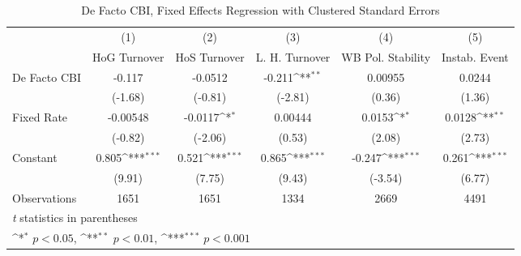 \begin{table}[htbp]\centering
\def\sym#1{\ifmmode^{#1}\else\(^{#1}\)\fi}
\caption{De Facto CBI, Fixed Effects Regression with Clustered Standard Errors \label{multIndFEDF}}
\begin{tabular}{l*{5}{c}}
\toprule
                                        &\multicolumn{1}{c}{(1)}&\multicolumn{1}{c}{(2)}&\multicolumn{1}{c}{(3)}&\multicolumn{1}{c}{(4)}&\multicolumn{1}{c}{(5)}\\
                                        &\multicolumn{1}{c}{HoG Turnover}&\multicolumn{1}{c}{HoS Turnover}&\multicolumn{1}{c}{L. H. Turnover}&\multicolumn{1}{c}{WB Pol. Stability}&\multicolumn{1}{c}{Instab. Event}\\
\midrule
De Facto CBI                            &   -0.117         &  -0.0512         &   -0.211\sym{**} &  0.00955         &   0.0244         \\
                                        &  (-1.68)         &  (-0.81)         &  (-2.81)         &   (0.36)         &   (1.36)         \\
\addlinespace
Fixed Rate                              & -0.00548         &  -0.0117\sym{*}  &  0.00444         &   0.0153\sym{*}  &   0.0128\sym{**} \\
                                        &  (-0.82)         &  (-2.06)         &   (0.53)         &   (2.08)         &   (2.73)         \\
\addlinespace
Constant                                &    0.805\sym{***}&    0.521\sym{***}&    0.865\sym{***}&   -0.247\sym{***}&    0.261\sym{***}\\
                                        &   (9.91)         &   (7.75)         &   (9.43)         &  (-3.54)         &   (6.77)         \\
\midrule
Observations                            &     1651         &     1651         &     1334         &     2669         &     4491         \\
\bottomrule
\multicolumn{6}{l}{\footnotesize \textit{t} statistics in parentheses}\\
\multicolumn{6}{l}{\footnotesize \sym{*} \(p<0.05\), \sym{**} \(p<0.01\), \sym{***} \(p<0.001\)}\\
\end{tabular}
\end{table}
